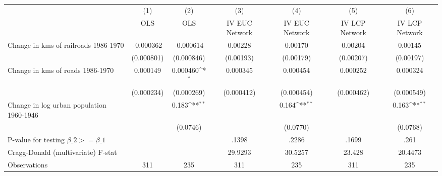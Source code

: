 {
\def\sym#1{\ifmmode^{#1}\else\(^{#1}\)\fi}
\begin{tabular}{l*{6}{c}}
\hline\hline
                &\multicolumn{1}{c}{(1)}&\multicolumn{1}{c}{(2)}&\multicolumn{1}{c}{(3)}&\multicolumn{1}{c}{(4)}&\multicolumn{1}{c}{(5)}&\multicolumn{1}{c}{(6)}\\
                &\multicolumn{1}{c}{OLS}&\multicolumn{1}{c}{OLS}&\multicolumn{1}{c}{IV EUC Network}&\multicolumn{1}{c}{IV EUC Network}&\multicolumn{1}{c}{IV LCP Network}&\multicolumn{1}{c}{IV LCP Network}\\
\hline
Change in kms of railroads 1986-1970&-0.000362         &-0.000614         &  0.00228         &  0.00170         &  0.00204         &  0.00145         \\
                &(0.000801)         &(0.000846)         &(0.00193)         &(0.00179)         &(0.00207)         &(0.00197)         \\
[1em]
Change in kms of roads 1986-1970& 0.000149         & 0.000460\sym{*}  & 0.000345         & 0.000454         & 0.000252         & 0.000324         \\
                &(0.000234)         &(0.000269)         &(0.000412)         &(0.000454)         &(0.000462)         &(0.000549)         \\
[1em]
Change in log urban population 1960-1946&                  &    0.183\sym{**} &                  &    0.164\sym{**} &                  &    0.163\sym{**} \\
                &                  & (0.0746)         &                  & (0.0770)         &                  & (0.0768)         \\
\hline
P-value for testing $\beta\_{2} >= \beta\_{1}$&                  &                  &    .1398         &    .2286         &    .1699         &     .261         \\
Cragg-Donald (multivariate) F-stat&                  &                  &  29.9293         &  30.5257         &   23.428         &  20.4473         \\
Observations    &      311         &      235         &      311         &      235         &      311         &      235         \\
\hline\hline
\end{tabular}
}
